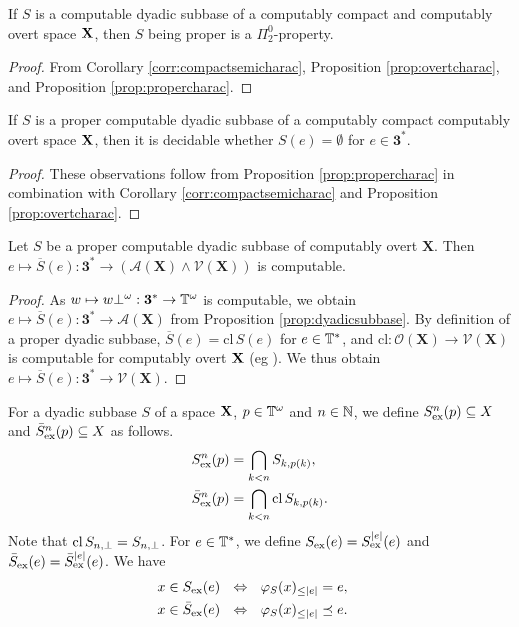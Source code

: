 \documentclass{eptcs-modified}
\begin{document}
\begin{proposition}\label{prop:pi02}
If $S$ is a computable dyadic subbase of a computably compact and computably overt space $\mathbf{X}$, then $S$ being proper is a $\Pi^0_2$-property.
\end{proposition}
\begin{proof}
  From
  Corollary \ref{corr:compactsemicharac}, Proposition \ref{prop:overtcharac},
  and Proposition \ref{prop:propercharac}.
\end{proof}

\begin{proposition}\label{prop:decidable}
If $S$ is a proper computable dyadic subbase of a computably compact computably overt space $\mathbf{X}$, then
it is decidable whether $S(e) = \emptyset$ for $e \in \mathbf{3}^*$.
\end{proposition}
\begin{proof}
These observations follow from Proposition \ref{prop:propercharac} in combination with Corollary \ref{corr:compactsemicharac} and Proposition \ref{prop:overtcharac}.
\end{proof}


\begin{corollary}
\label{corr:dyadicsubbase}
Let $S$ be a proper computable dyadic subbase of computably overt $\mathbf{X}$. Then $e \mapsto \overline{S}(e) : \mathbf{3}^* \to \left ( \mathcal{A}(\mathbf{X}) \wedge \mathcal{V}(\mathbf{X}) \right )$ is computable.
\begin{proof}
As $w \mapsto w\bot^\omega : \mathbf{3}^* \to \mathbb{T}^\omega$ is computable, we obtain $e\mapsto \overline{S}(e) : \mathbf{3}^*
 \to \mathcal{A}(\mathbf{X})$ from Proposition \ref{prop:dyadicsubbase}. By definition of a proper dyadic subbase, $\overline{S}(e) = \textrm{cl}\, S(e)$ for $e \in \mathbb{T}^*$, and $\textrm{cl} : \mathcal{O}(\mathbf{X}) \to \mathcal{V}(\mathbf{X})$ is computable for computably overt $\mathbf{X}$ (eg \cite{pauly-synthetic}). We thus obtain $e \mapsto \overline{S}(e) : \mathbf{3}^* \to \mathcal{V}(\mathbf{X})$.
\end{proof}
\end{corollary}

\begin{definition}
\label{def:excase}
For a dyadic subbase $S$ of a space $\mathbf{X}$,
$p \in \mathbb{T}^{\omega}$ and $n \in \mathbb{N}$,
we define $S_{\mathrm{ex}}^n(p) \subseteq X$
and $\bar{S}_{\mathrm{ex}}^n(p) \subseteq X$ as follows.
\begin{alignat*}{2}
S_{\mathrm{ex}}^n(p) &= \bigcap_{k < n}S_{k,p(k)}, \\
\bar{S}_{\mathrm{ex}}^n(p) &= \bigcap_{k < n}\textrm{cl}\, S_{k,p(k)}.
\end{alignat*}
Note that
$\textrm{cl}\, S_{n,\bot} = S_{n,\bot}$.
For $e \in \mathbb{T}^*$, we define $S_{\mathrm{ex}}(e) = S_{\mathrm{ex}}^{|e|}(e)$ and  $\bar{S}_{\mathrm{ex}}(e) = \bar{S}_{\mathrm{ex}}^{|e|}(e)$.  We have
\begin{alignat}{2}
x\in S_{\mathrm{ex}}(e)&\  \  \Leftrightarrow\  \   \varphi_S(x)_{\leq |e|} = e,& \label{eq:bars}\\
x\in \bar{S}_{\mathrm{ex}}(e) &\  \  \Leftrightarrow\  \   \varphi_S(x)_{\leq |e|} \preceq  e.&\label{eq:barcs}
\end{alignat}
\end{definition}
\end{document}
